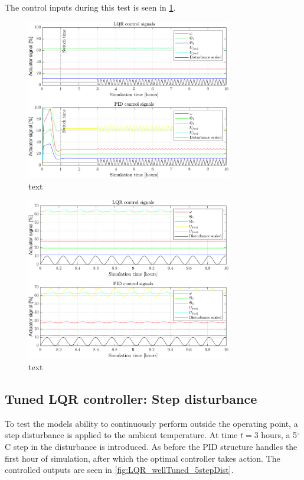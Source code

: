 The control inputs during this test is seen in \cref{fig:inputs_sineDist}.

\begin{figure}[H]
	\centering
	\includegraphics[width=0.8\textwidth]{Graphics/fig_inputs_sineDist.png}
	\caption{text}
	\label{fig:inputs_sineDist}
\end{figure}

\begin{figure}[H]
	\centering
	\includegraphics[width=0.8\textwidth]{Graphics/fig_inputs_sineDist_zoom.png}
	\caption{text}
	\label{fig:inputs_sineDist_zoom}
\end{figure}


\newpage
\subsection{Tuned LQR controller: Step disturbance}
To test the models ability to continuously perform outside the operating point, a step disturbance is applied to the ambient temperature.  At time $t=3$ hours, a 5$^{\circ}$C step in the disturbance is introduced. As before the PID structure handles the first hour of simulation, after which the optimal controller takes action. The controlled outputs are seen in \cref{fig:LQR_wellTuned_5stepDist}.\\

